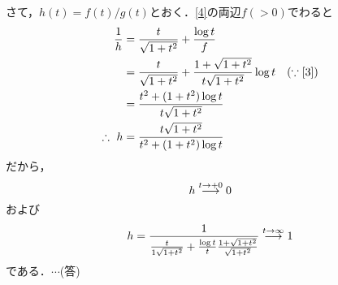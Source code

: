 \documentclass[a4j]{jarticle}
\begin{document}
\begin{multicols}{2}
さて，$h(t)=f(t)/g(t)$とおく．\eqref{4}の両辺$f(>0)$でわると
     \begin{align*}
     \frac{1}{h}&=\frac{t}{\sqrt{1+t^2}}+\frac{\log t}{f} \\
     &=\frac{t}{\sqrt{1+t^2}}+\frac{1+\sqrt{1+t^2}}{t\sqrt{1+t^2}}\log t &(\because \eqref{3}) \\
     &=\frac{t^2+(1+t^2)\log t}{t\sqrt{1+t^2}} \\
     \therefore\,\, h&=\frac{t\sqrt{1+t^2}}{t^2+(1+t^2)\log t}
     \end{align*}
だから，
     \[h\stackrel{t \to +0}{\longrightarrow}0\]
および
     \begin{align*}
     h=\frac{1}{\frac{t}{1\sqrt{1+t^2}}+\frac{\log t}{t}\frac{1+\sqrt{1+t^2}}{\sqrt{1+t^2}}}\stackrel{t \to \infty}{\longrightarrow}1
     \end{align*}
である．$\cdots$(答)
\newpage
\end{multicols}
\end{document}
